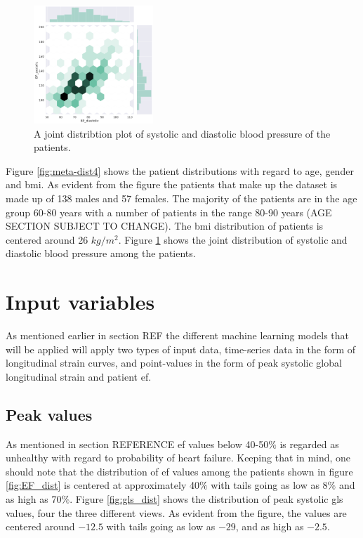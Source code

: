 \begin{figure}
    \begin{center}
    \includegraphics[width=0.4\textwidth]{data-exp/bp.png}
    \end{center}
    \caption{A joint distribtion plot of systolic and diastolic blood pressure of the patients.}
    \label{fig:bp-dist}
\end{figure}

Figure \ref{fig:meta-dist4} shows the patient distributions with regard to age, gender and \acrshort{bmi}. 
As evident from the figure the patients that make up the dataset is made up of 138 males and 57 females. 
The majority of the patients are in the age group 60-80 years with a number of patients in the range 80-90 years (AGE SECTION SUBJECT TO CHANGE). 
The \acrshort{bmi} distribution of patients is centered around 26 $kg/m^2$. 
Figure \ref{fig:bp-dist} shows the joint distribution of systolic and diastolic blood pressure among the patients. \bigskip

\section{Input variables} \label{sec:covariates}
As mentioned earlier in section REF the different machine learning models that will be applied will apply two types of input data, 
time-series data in the form of longitudinal strain curves, and point-values in the form of peak systolic global longitudinal strain and patient \acrshort{ef}. \bigskip

\subsection{Peak values}
As mentioned in section REFERENCE \acrshort{ef} values below 40-50$\%$ is regarded as unhealthy with regard to probability of heart failure. 
Keeping that in mind, one should note that the distribution of \acrshort{ef} values among the patients shown in figure \ref{fig:EF_dist} 
is centered at approximately 40$\%$ with tails going as low as 8$\%$ and as high as 70$\%$. 
Figure \ref{fig:gls_dist} shows the distribution of peak systolic \acrshort{gls} values, four the three different views. 
As evident from the figure, the values are centered around $-12.5$ with tails going as low as $-29$, and as high as $-2.5$. \bigskip

